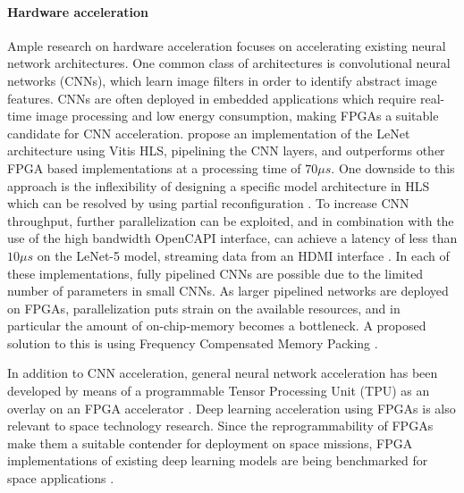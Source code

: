 \paragraph{Hardware acceleration} Ample research on hardware acceleration focuses on accelerating existing neural network architectures. One common class of architectures is convolutional neural networks (CNNs), which learn image filters in order to identify abstract image features. CNNs are often deployed in embedded applications which require real-time image processing and low energy consumption, making FPGAs a suitable candidate for CNN acceleration. \citet{ml-energy-efficient-cnn} propose an implementation of the LeNet architecture using Vitis HLS, pipelining the CNN layers, and outperforms other FPGA based implementations at a processing time of $70 \mu s$. One downside to this approach is the inflexibility of designing a specific model architecture in HLS which can be resolved by using partial reconfiguration \cite{ml-cnn-acclr-part-reconf}. To increase CNN throughput, further parallelization can be exploited, and in combination with the use of the high bandwidth OpenCAPI interface, can achieve a latency of less than $10 \mu s$ on the LeNet-5 model, streaming data from an HDMI interface \cite{ml-FPQNet}. In each of these implementations, fully pipelined CNNs are possible due to the limited number of parameters in small CNNs. As larger pipelined networks are deployed on FPGAs, parallelization puts strain on the available resources, and in particular the amount of on-chip-memory becomes a bottleneck. A proposed solution to this is using Frequency Compensated Memory Packing \cite{ml-mem-efficient-df-inf}.

In addition to CNN acceleration, general neural network acceleration has been developed by means of a programmable Tensor Processing Unit (TPU) as an overlay on an FPGA accelerator \cite{ml-agile-tuned-tpu}. Deep learning acceleration using FPGAs is also relevant to space technology research. Since the reprogrammability of FPGAs make them a suitable contender for deployment on space missions, FPGA implementations of existing deep learning models are being benchmarked for space applications \cite{ml-myriad-2-space-cnn} \cite{ml-mem-efficient-df-inf}.


